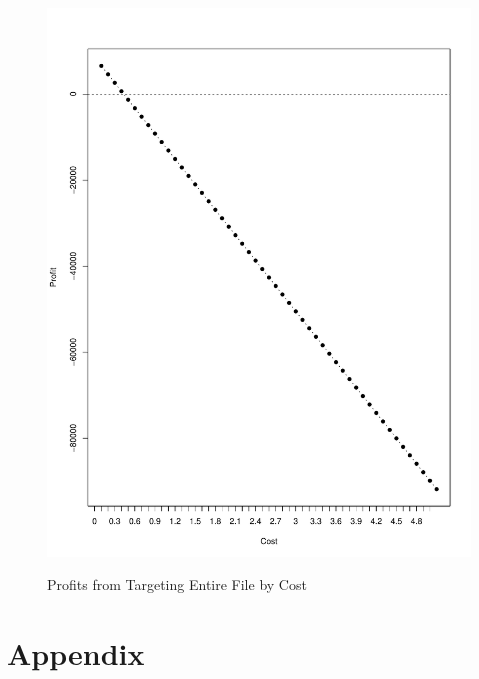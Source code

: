 \begin{figure}[!htb]
  \centering
  \caption{Profits from Targeting Entire File by Cost}
  \includegraphics[scale=.75]{Profit_Grid.pdf}
  \label{fig:Profit_Grid}
\end{figure}

\clearpage
\section{Appendix}




% 


